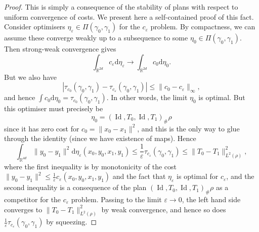 \documentclass[11pt, oneside, titlepage]{book}
\theoremstyle{plain}
\theoremstyle{definition}
\newcommand{\R}{\mathbb{R}}
\newcommand{\di}{\mathrm{d}}
\DeclareMathOperator{\id}{Id}
\begin{document}
\begin{proof}
    This is simply a consequence of the stability of plans with respect to uniform convergence of costs. We present here a self-contained proof of this fact. Consider optimisers $\eta_\varepsilon \in \Pi(\gamma_0, \gamma_1)$ for the $c_\varepsilon$ problem. By compactness, we can assume these converge weakly up to a subsequence to some $\eta_0 \in \Pi(\gamma_0, \gamma_1)$. Then strong-weak convergence gives
    \begin{equation*}
        \int_{\R^{2d}} c_\varepsilon \di \eta_\varepsilon \to \int_{\R^{2d}} c_0 \di \eta_0.
    \end{equation*}
    But we also have
    \begin{equation*}
        |\tau_{c_0}(\gamma_0, \gamma_1) - \tau_{c_{\varepsilon}}(\gamma_0, \gamma_1) | \leq \|c_0 - c_\varepsilon\|_\infty,
    \end{equation*}
    and hence $\int c_0 \di \eta_0 = \tau_{c_0}(\gamma_0, \gamma_1)$. In other words, the limit $\eta_0$ is optimal. But this optimiser must precisely be
    \begin{equation*}
        \eta_0 = (\id, T_0, \id, T_1)_{\#}\rho
    \end{equation*}
    since it has zero cost for $c_0 = \| x_0 - x_1\|^2$, and this is the only way to glue through the identity (since we have existence of maps). Hence
    \begin{equation*}
        \int_{\R^{4d}} \|y_0 - y_1\|^2 \di \eta_\varepsilon(x_0, y_0, x_1, y_1) \leq \frac{1}{\varepsilon} \tau_{c_\varepsilon}(\gamma_0, \gamma_1) \leq \| T_0 - T_1 \|^2_{L^2(\rho)},
    \end{equation*}
    where the first inequality is by monotonicity of the cost $\| y_0 - y_1\|^2 \leq \frac{1}{\varepsilon}c_\varepsilon(x_0, y_0, x_1, y_1) $ and the fact that $\eta_\varepsilon$ is optimal for $c_\varepsilon$, and the second inequality is a consequence of the plan $(\id, T_0, \id, T_1)_\#\rho$ as a competitor for the $c_\varepsilon$ problem. Passing to the limit $\varepsilon \to 0$, the left hand side converges to $\| T_0 - T_1 \|_{L^2(\rho)}^2$ by weak convergence, and hence so does $\frac{1}{\varepsilon} \tau_{c_\varepsilon}(\gamma_0, \gamma_1)$ by squeezing.
\end{proof}
\end{document}
